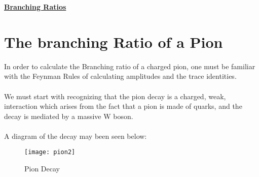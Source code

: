 \documentclass[12pt]{article}
\begin{document}
\begin{center}
\underline{\textbf{\Large Branching Ratios}}
\end{center}

\section{The branching Ratio of a Pion}
In order to calculate the Branching ratio of a charged pion, one must be familiar with the Feynman Rules of calculating amplitudes and the trace identities. \\
\\
We must start with recognizing that the pion decay is a charged, weak, interaction which arises from the fact that a pion is made of quarks, and the decay is mediated by a massive W boson. \\
\\
A diagram of the decay may been seen below: 
\begin{figure}[h]
\centering
\texttt{[image: pion2]}
\caption{Pion Decay}
\end{figure}
\end{document}
